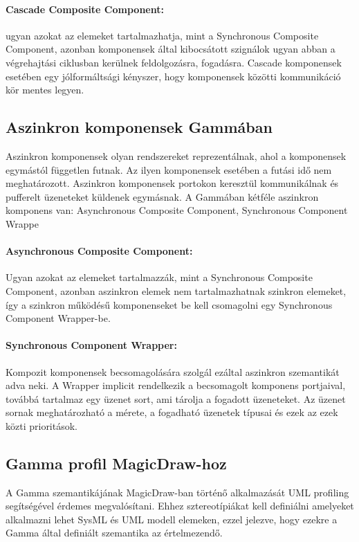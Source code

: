 \paragraph{Cascade Composite Component:} ugyan azokat az elemeket tartalmazhatja, mint a Synchronous Composite Component, azonban komponensek által kibocsátott szignálok ugyan abban a végrehajtási ciklusban kerülnek feldolgozásra, fogadásra. Cascade komponensek esetében egy jólformáltsági kényszer, hogy komponensek közötti kommunikáció kör mentes legyen.

\subsection{Aszinkron komponensek Gammában}
Aszinkron komponensek olyan rendszereket reprezentálnak, ahol a komponensek egymástól független futnak. Az ilyen komponensek esetében a futási idő nem meghatározott. Aszinkron komponensek portokon keresztül kommunikálnak és pufferelt üzeneteket küldenek egymásnak. A Gammában kétféle aszinkron komponens van: Asynchronous Composite Component, Synchronous Component Wrappe

\paragraph{Asynchronous Composite Component:} Ugyan azokat az elemeket tartalmazzák, mint a Synchronous Composite Component, azonban aszinkron elemek nem tartalmazhatnak szinkron elemeket, így a szinkron működésű komponenseket be kell csomagolni egy Synchronous Component Wrapper-be.

\paragraph{Synchronous Component Wrapper:} Kompozit komponensek becsomagolására szolgál ezáltal aszinkron szemantikát adva neki. A Wrapper implicit rendelkezik a becsomagolt komponens portjaival, továbbá tartalmaz egy üzenet sort, ami tárolja a fogadott üzeneteket. Az üzenet sornak meghatározható a mérete, a fogadható üzenetek típusai és ezek az ezek közti prioritások.


\subsection{Gamma profil MagicDraw-hoz}

A Gamma szemantikájának MagicDraw-ban történő alkalmazását UML profiling segítségével érdemes megvalósítani. Ehhez sztereotípiákat kell definiálni amelyeket alkalmazni lehet SysML és UML modell elemeken, ezzel jelezve, hogy ezekre a Gamma által definiált szemantika az értelmezendő.

